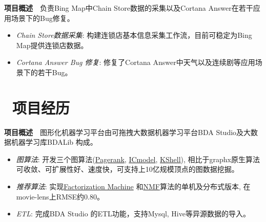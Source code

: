\documentclass[10pt,a4paper]{resume}
\begin{document}
\begin{onehalfspacing}
\textbf{项目概述}\ \ 负责Bing Map中Chain Store数据的采集以及Cortana Answer在若干应用场景下的Bug修复。
\begin{itemize}
  \item {\emph{Chain Store数据采集}}: 构建连锁店基本信息采集工作流，目前可稳定为Bing Map提供连锁店数据。
  \item {\emph{Cortana Answer Bug 修复}}: 修复了Cortana Answer中天气以及连续剧等应用场景下的若干Bug。
\end{itemize}
\end{onehalfspacing}

\section{\faUsers\ 项目经历}
\begin{onehalfspacing}
\textbf{项目概述}\ \ 图形化机器学习平台由可拖拽大数据机器学习平台BDA Studio及大数据机器学习库BDALib 构成。
\begin{itemize}
  \item {\emph{图算法}}: 开发三个图算法(\href{http://bda.space:18080/BDAStudioMonitor.html?job=0000001-160229111630187-oozie-oozi-W}{Pagerank}, \href{http://bda.space:18080/BDAStudioMonitor.html?job=0000015-160229111630187-oozie-oozi-W}{ICmodel}, \href{http://bda.space:18080/BDAStudioMonitor.html?job=0000206-151222123224608-oozie-oozi-W}{KShell}), 相比于graphx原生算法可收敛、可扩展性好、速度快，可支持上10亿规模顶点的图数据挖掘。
  \item {\emph{推荐算法}}: 实现\href{http://bda.space:18080/BDAStudioMonitor.html?job=0000009-160229111630187-oozie-oozi-W}{Factorization Machine} 和\href{http://bda.space:18080/BDAStudioMonitor.html?job=0000021-160229111630187-oozie-oozi-W}{NMF}算法的单机及分布式版本, 在movie-lens上RMSE约0.80。
 \item {\emph{ETL}}: 完成BDA Studio 的ETL功能，支持Mysql, Hive等异源数据的导入。
\end{itemize}
\end{onehalfspacing}
\end{document}
